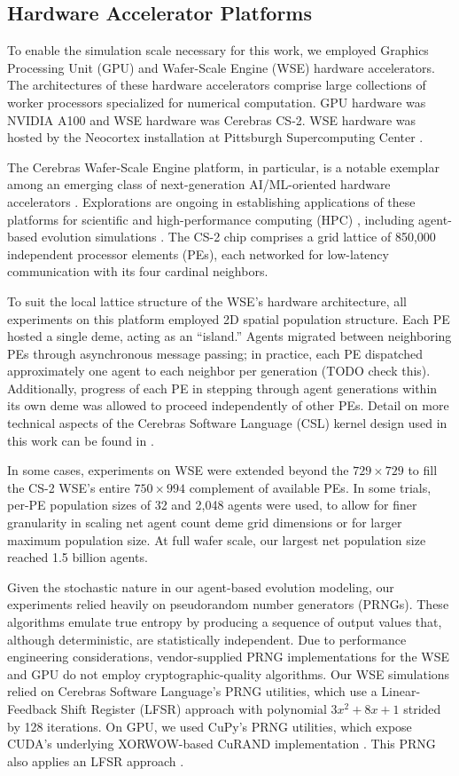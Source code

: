 \subsection{Hardware Accelerator Platforms} \label{sec:hardware}

To enable the simulation scale necessary for this work, we employed Graphics Processing Unit (GPU) and Wafer-Scale Engine (WSE) hardware accelerators.
The architectures of these hardware accelerators comprise large collections of worker processors specialized for numerical computation.
GPU hardware was NVIDIA A100 and WSE hardware was Cerebras CS-2.
WSE hardware was hosted by the Neocortex installation at Pittsburgh Supercomputing Center \citep{buitrago2021neocortex}.

The Cerebras Wafer-Scale Engine platform, in particular, is a notable exemplar among an emerging class of next-generation AI/ML-oriented hardware accelerators \citep{TODO}.
Explorations are ongoing in establishing applications of these platforms for scientific and high-performance computing (HPC) \citep{TODO}, including agent-based evolution simulations \citep{TODO}.
The CS-2 chip comprises a grid lattice of 850,000 independent processor elements (PEs), each networked for low-latency communication with its four cardinal neighbors.

To suit the local lattice structure of the WSE's hardware architecture, all experiments on this platform employed 2D spatial population structure.
Each PE hosted a single deme, acting as an ``island.''
Agents migrated between neighboring PEs through asynchronous message passing;
in practice, each PE dispatched approximately one agent to each neighbor per generation (TODO check this).
Additionally, progress of each PE in stepping through agent generations within its own deme was allowed to proceed independently of other PEs.
Detail on more technical aspects of the Cerebras Software Language (CSL) kernel design used in this work can be found in \citet{TODO}.

In some cases, experiments on WSE were extended beyond the $729 \times 729$ to fill the CS-2 WSE's entire $750 \times 994$ complement of available PEs.
In some trials, per-PE population sizes of 32 and 2,048 agents were used, to allow for finer granularity in scaling net agent count deme grid dimensions or for larger maximum population size.
At full wafer scale, our largest net population size reached 1.5 billion agents.

Given the stochastic nature in our agent-based evolution modeling, our experiments relied heavily on pseudorandom number generators (PRNGs).
These algorithms emulate true entropy by producing a sequence of output values that, although deterministic, are statistically independent.
Due to performance engineering considerations, vendor-supplied PRNG implementations for the WSE and GPU do not employ cryptographic-quality algorithms.
Our WSE simulations relied on Cerebras Software Language's PRNG utilities, which use a Linear-Feedback Shift Register (LFSR) approach with polynomial $3x^2 + 8x + 1$ strided by 128 iterations.
On GPU, we used CuPy's PRNG utilities, which expose CUDA's underlying XORWOW-based CuRAND implementation \citep{marsaglia2003xorshift}.
This PRNG also applies an LFSR approach \citep{brent2004note}.

